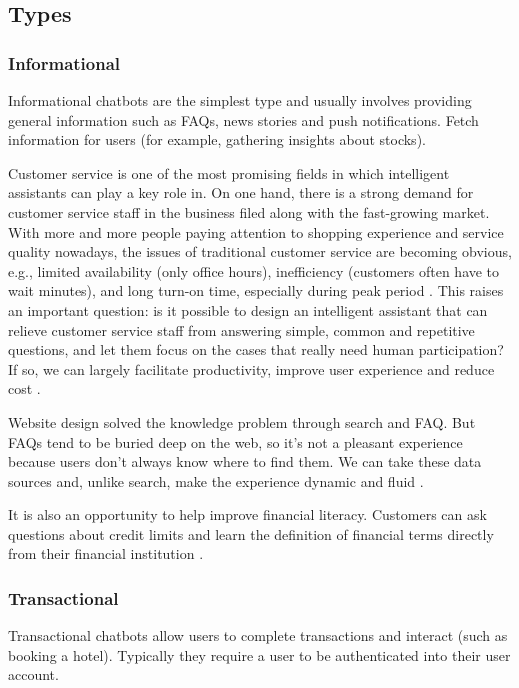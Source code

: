 \subsection{Types}

\subsubsection{Informational}
Informational chatbots are the simplest type and usually involves providing general information such as FAQs, news stories and push notifications. Fetch information for users (for example, gathering insights about stocks).

Customer service is one of the most promising fields in which intelligent assistants can play a key role in. On one hand, there is a strong demand for customer service staff in the business filed along with the fast-growing market. With more and more people paying attention to shopping experience and service quality nowadays, the issues of traditional customer service are becoming obvious, e.g., limited availability (only office hours), inefficiency (customers often have to wait minutes), and long turn-on time, especially during peak period \cite{li2017}. This raises an important question: is it possible to design an intelligent assistant that can relieve customer service staff from answering simple, common and repetitive questions, and let them focus on the cases that really need human participation? If so, we can largely facilitate productivity, improve user experience and reduce cost \cite{li2017}.

Website design solved the knowledge problem through search and FAQ. But FAQs tend to be buried deep on the web, so it's not a pleasant experience because users don't always know where to find them. We can take these data sources and, unlike search, make the experience dynamic and fluid \cite{etlinger2017}.

It is also an opportunity to help improve financial literacy. Customers can ask questions about credit limits and learn the definition of financial terms directly from their financial institution \cite{etlinger2017}.

\subsubsection{Transactional}
Transactional chatbots allow users to complete transactions and interact (such as booking a hotel). Typically they require a user to be authenticated into their user account.

